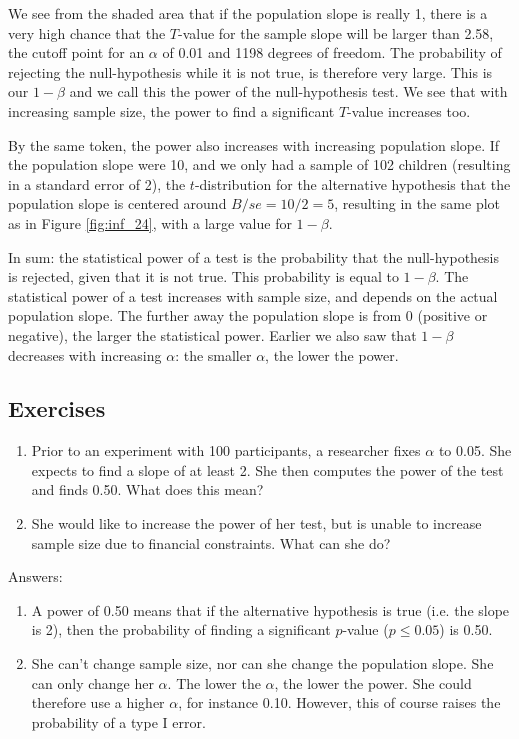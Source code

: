 \documentclass[]{report}\usepackage[]{graphicx}\usepackage[]{color}
\begin{document}
We see from the shaded area that if the population slope is really 1, there is a very high chance that the $T$-value for the sample slope will be larger than 2.58, the cutoff point for an $\alpha$ of 0.01 and 1198 degrees of freedom. The probability of rejecting the null-hypothesis while it is not true, is therefore very large. This is our $1-\beta$ and we call this the power of the null-hypothesis test. We see that with increasing sample size, the power to find a significant $T$-value increases too.

By the same token, the power also increases with increasing population slope. If the population slope were 10, and we only had a sample of 102 children (resulting in a standard error of 2), the $t$-distribution for the alternative hypothesis that the population slope is centered around $B/se=10/2=5$, resulting in the same plot as in Figure \ref{fig:inf_24}, with a large value for $1-\beta$.


In sum: the statistical power of a test is the probability that the null-hypothesis is rejected, given that it is not true. This probability is equal to $1-\beta$. The statistical power of a test increases with sample size, and depends on the actual population slope. The further away the population slope is from 0 (positive or negative), the larger the statistical power. Earlier we also saw that $1-\beta$ decreases with increasing $\alpha$: the smaller $\alpha$, the lower the power.


\subsection{Exercises}


\begin{enumerate}

\item Prior to an experiment with 100 participants, a researcher fixes $\alpha$ to 0.05. She expects to find a slope of at least 2. She then computes the power of the test and finds 0.50. What does this mean?

\item She would like to increase the power of her test, but is unable to increase sample size due to financial constraints. What can she do?


\end{enumerate}


Answers:

\begin{enumerate}

\item A power of 0.50 means that if the alternative hypothesis is true (i.e. the slope is 2), then the probability of finding a significant $p$-value ($p \leq 0.05$) is 0.50.

\item She can't change sample size, nor can she change the population slope. She can only change her $\alpha$. The lower the $\alpha$, the lower the power. She could therefore use a higher $\alpha$, for instance 0.10. However, this of course raises the probability of a type I error.


\end{enumerate}
\end{document}
